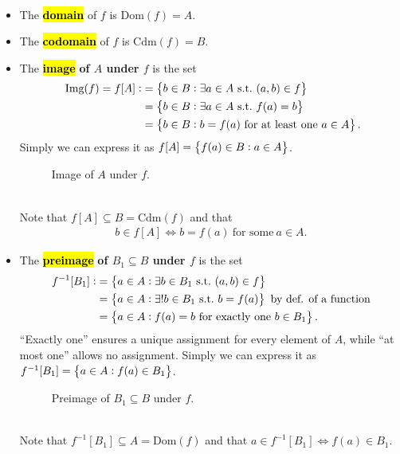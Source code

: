\documentclass[11pt,openany]{article}
\begin{document}
\begin{remark*}
	\ \begin{itemize}
		\item The \hl{\textbf{domain}} of $f$ is $\text{Dom}(f)=A$.
		\item The \hl{\textbf{codomain}} of $f$ is $\text{Cdm}(f)=B$.
		\item The \hl{\textbf{image}} \textbf{of $A$ under $f$} is the set \begin{align*}\
			\img{f}=f[A]:&=\set{b\in B:\exists a \in A\ \text{s.t.}\ (a,b)\in f}\\
			&=\set{b\in B:\exists a \in A\ \text{s.t.}\ f(a)=b}\\
			&=\set{b\in B: b = f(a)\ \text{for at least one}\ a\in A}.
		\end{align*} Simply we can express it as $f[A]=\set{f(a)\in B:a\in A}$. 
		\begin{figure}[h!]\centering
			
			\caption{Image of $A$ under $f$.}
		\end{figure}\\
		Note that $f[A]\subseteq B=\text{Cdm}(f)$ and that \begin{align*}
			b\in f[A]\iff b=f(a)\ \text{for some}\ a\in A.
		\end{align*}
		\item The \hl{\textbf{preimage}} \textbf{of $B_1\subseteq B$ under $f$} is the set \begin{align*}
			f^{-1}[B_1]:&=\set{a\in A:\exists b \in B_1\ \text{s.t.}\ (a,b)\in f}\\
			&=\set{a\in A:\exists! b \in B_1\ \text{s.t.}\ b=f(a)}\ \text{by def. of a function}\\
			&=\set{a\in A:f(a)=b\ \text{for exactly one}\ b\in B_1}.
		\end{align*} ``Exactly one'' ensures a unique assignment for every element of $A$, while ``at most one'' allows no assignment. Simply we can express it as $f^{-1}[B_1]=\set{a\in A:f(a)\in B_1}$.
		\begin{figure}[h!]\centering
			
			\caption{Preimage of $B_1\subseteq B$ under $f$.}
		\end{figure}\\
		Note that $f^{-1}[B_1]\subseteq A=\text{Dom}(f)$ and that $a\in f^{-1}[B_1]\iff f(a)\in B_1.$
	\end{itemize}
\end{remark*}
\end{document}
